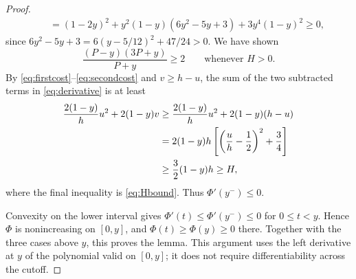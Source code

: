 \documentclass[11pt]{article}
\numberwithin{equation}{section}
\begin{document}
\begin{proof}
\begin{align}
 &\quad=(1-2y)^2+y^2(1-y)(6y^2-5y+3)
 +3y^4(1-y)^2\ge0,
\end{align}
since $6y^2-5y+3=6(y-5/12)^2+47/24>0$. We have shown
\begin{equation}\label{eq:secondcost}
 \frac{(P-y)(3P+y)}{P+y}\ge2\qquad\text{whenever }H>0.
\end{equation}
By \eqref{eq:firstcost}--\eqref{eq:secondcost} and $v\ge h-u$, the sum of the two subtracted terms in \eqref{eq:derivative} is at least
\begin{align}\label{eq:finalsquare}
 \frac{2(1-y)}h u^2+2(1-y)v
 &\ge\frac{2(1-y)}h u^2+2(1-y)(h-u)\notag\\
 &=2(1-y)h\left[\left(\frac uh-\frac12\right)^2+\frac34\right]\notag\\
 &\ge\frac32(1-y)h\ge H,
\end{align}
where the final inequality is \eqref{eq:Hbound}. Thus $\Phi'(y^-)\le0$.

Convexity on the lower interval gives
$\Phi'(t)\le\Phi'(y^-)\le0$ for $0\le t<y$. Hence $\Phi$
is nonincreasing on $[0,y]$, and
$\Phi(t)\ge\Phi(y)\ge0$ there. Together with the three cases
above $y$, this proves the lemma. This argument uses the left
derivative at $y$ of the polynomial valid on $[0,y]$; it does not
require differentiability across the cutoff.
\end{proof}
\end{document}
